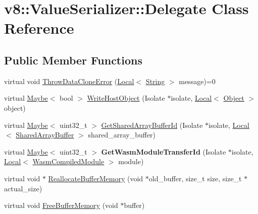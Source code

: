 \hypertarget{classv8_1_1ValueSerializer_1_1Delegate}{}\section{v8\+:\+:Value\+Serializer\+:\+:Delegate Class Reference}
\label{classv8_1_1ValueSerializer_1_1Delegate}
\subsection*{Public Member Functions}
\begin{DoxyCompactItemize}
\item 
virtual void \mbox{\hyperlink{classv8_1_1ValueSerializer_1_1Delegate_a3681bfcd9a6c45f0b12bd7a8bdf34d85}{Throw\+Data\+Clone\+Error}} (\mbox{\hyperlink{classv8_1_1Local}{Local}}$<$ \mbox{\hyperlink{classv8_1_1String}{String}} $>$ message)=0
\item 
virtual \mbox{\hyperlink{classv8_1_1Maybe}{Maybe}}$<$ bool $>$ \mbox{\hyperlink{classv8_1_1ValueSerializer_1_1Delegate_ae97808060b22d7a94517f725922b72c6}{Write\+Host\+Object}} (Isolate $\ast$isolate, \mbox{\hyperlink{classv8_1_1Local}{Local}}$<$ \mbox{\hyperlink{classv8_1_1Object}{Object}} $>$ object)
\item 
virtual \mbox{\hyperlink{classv8_1_1Maybe}{Maybe}}$<$ uint32\+\_\+t $>$ \mbox{\hyperlink{classv8_1_1ValueSerializer_1_1Delegate_a963946ef185d992552e8d9e0e4016137}{Get\+Shared\+Array\+Buffer\+Id}} (Isolate $\ast$isolate, \mbox{\hyperlink{classv8_1_1Local}{Local}}$<$ \mbox{\hyperlink{classv8_1_1SharedArrayBuffer}{Shared\+Array\+Buffer}} $>$ shared\+\_\+array\+\_\+buffer)
\item 
\mbox{\label{classv8_1_1ValueSerializer_1_1Delegate_aa4dada6ecdbb5e3ba4189bfb7c5ffc80}} 
virtual \mbox{\hyperlink{classv8_1_1Maybe}{Maybe}}$<$ uint32\+\_\+t $>$ {\bfseries Get\+Wasm\+Module\+Transfer\+Id} (Isolate $\ast$isolate, \mbox{\hyperlink{classv8_1_1Local}{Local}}$<$ \mbox{\hyperlink{classv8_1_1WasmCompiledModule}{Wasm\+Compiled\+Module}} $>$ module)
\item 
virtual void $\ast$ \mbox{\hyperlink{classv8_1_1ValueSerializer_1_1Delegate_a28e0ab8d14f5c9391df47cf75b4594fc}{Reallocate\+Buffer\+Memory}} (void $\ast$old\+\_\+buffer, size\+\_\+t size, size\+\_\+t $\ast$actual\+\_\+size)
\item 
virtual void \mbox{\hyperlink{classv8_1_1ValueSerializer_1_1Delegate_a6cea3e757221e6e15b0fdb708482a176}{Free\+Buffer\+Memory}} (void $\ast$buffer)
\end{DoxyCompactItemize}


